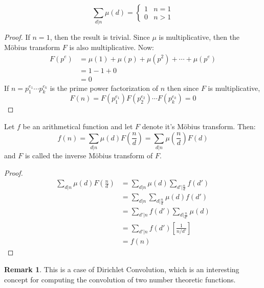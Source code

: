 \documentclass[12pt,letterpaper]{book}
\theoremstyle{definition}
\newtheorem*{remark}{Remark}
\begin{document}
\begin{lemma}
  \[\sum_{d|n} \mu(d) = \begin{cases} 
    1 & n=1 \\
    0 & n > 1
  \end{cases}\] 
\end{lemma}
\begin{proof}
  If $n=1$, then the result is trivial. Since $\mu$ is multiplicative, then the M\"{o}bius transform $F$ is also multiplicative. Now:
  \begin{align*}
    F(p^e) &= \mu(1) + \mu(p) + \mu(p^2) + \cdots + \mu(p^e) \\
           &= 1-1+0\\
           &= 0
  \end{align*}
  If $n = p_1^{e_1} \cdots p_k^{e_k}$ is the prime power factorization of $n$ then since $F$ is multiplicative,
  \[F(n) = F(p_1^{e_1}) F(p_2^{e_2}) \cdots F(p_k^{e_k}) = 0\]
\end{proof}

\begin{theorem}
  Let $f$ be an arithmetical function and let $F$ denote it's M\"{o}bius transform. Then:
  \[f(n) = \sum_{d|n} \mu(d) F \left( \frac{n}{d} \right) = \sum_{d|n} \mu \left( \frac{n}{d} \right)F(d)\]
  and $F$ is called the inverse M\"{o}bius transform of $F$.
\end{theorem}
\begin{proof}
  \begin{align*}
    \sum_{d|n} \mu(d) F \left(\frac{n}{d}\right) &= \sum_{d|n} \mu(d) \sum_{d'|\frac{n}{d}} f(d') \\
                                                 &= \sum_{d|n} \sum_{d|\frac{n}{d}} \mu(d) f(d') \\
                                                 &= \sum_{d'|n} f(d') \sum_{d|\frac{n}{d'}} \mu(d) \\
                                                 &= \sum_{d'|n} f(d') \left[ \frac{1}{n/d'} \right] \\
                                                 &= f(n)
  \end{align*}
\end{proof}

\begin{remark}
  This is a case of Dirichlet Convolution, which is an interesting concept for computing the convolution of two number theoretic functions.
\end{remark}
\end{document}
